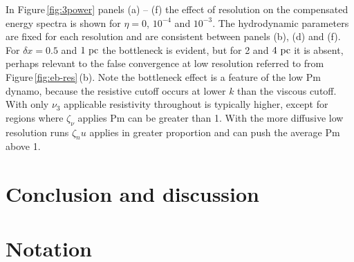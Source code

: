 \documentclass[preprint2]{aastex63}
\newcommand\pc{~ {\rm pc}}
\begin{document}
In Figure\,\ref{fig:3power} panels (a) -- (f) the effect of resolution on the
compensated energy spectra is shown for $\eta=0$, $10^{-4}$ and $10^{-3}$.
The hydrodynamic parameters are fixed for each resolution and are 
consistent between panels (b), (d) and (f).
For $\delta x=0.5$ and $1\pc$ the bottleneck is evident, but for 2 and $4\pc$ it
is absent, perhaps relevant to the false convergence at low resolution 
referred to from Figure\,\ref{fig:eb-res}\,(b).
Note the bottleneck effect is a feature of the low Pm dynamo, because the
resistive cutoff occurs at lower $k$ than the viscous cutoff.
With only $\nu_3$ applicable resistivity throughout is typically higher, 
except for regions where $\zeta_\nu$ applies Pm can be greater than 1.
With the more diffusive low resolution runs $\zeta_nu$ applies in greater
proportion and can push the average Pm above 1.

\section{Conclusion and discussion}\label{sec:conc}
{}


\appendix

\section{Notation}\label{sec:table}
\end{document}
